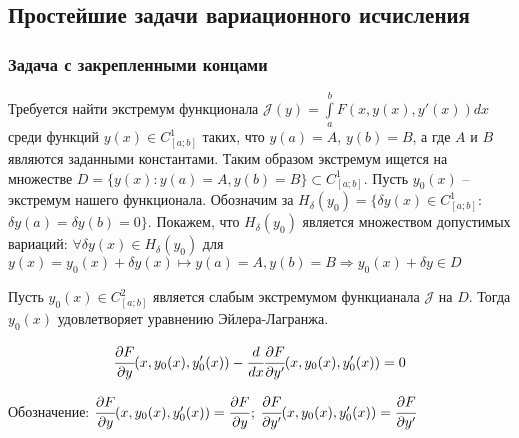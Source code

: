     \subsection{Простейшие задачи вариационного исчисления}
    \subsubsection{Задача с закрепленными концами}

    Требуется найти экстремум функционала $\mathcal{J} (y) = \int \limits^b_a F(x, y(x), y'(x)) dx$ среди функций $y(x) \in C^1_{[a;b]}$ таких, что $y(a) = A$, $y(b) = B$, а где $A$ и $B$ являются заданными константами.
    Таким образом экстремум ищется на множестве $D = \{y(x): y(a) = A, y(b) = B \} \subset C^1_{[a;b]}$. Пусть $y_0(x)$ -- экстремум нашего функционала. 
    Обозначим за $H_{\delta}(y_0) = \{ \delta y(x) \in C^1_{[a;b]}$: $\delta y(a) = \delta y(b) = 0 \}$.
    Покажем, что $H_{\delta}(y_0)$ является множеством допустимых вариаций: $\forall \delta y(x) \in H_{\delta}(y_0)$ для $y(x) = y_0(x) + \delta y(x) \mapsto y(a) = A, y(b) = B \Rightarrow y_0(x) + \delta y \in D$
    
    \begin{theorem}
        Пусть $y_0(x) \in C^2_{[a;b]}$ является слабым экстремумом функцианала $\mathcal{J}$ на $D$. Тогда $y_0(x)$ удовлетворяет уравнению Эйлера-Лагранжа.
        
        \begin{equation} \label{issue15:IF}
            \cfrac{\partial F}{\partial y}(x, y_0(x), y'_0(x)) - \cfrac{d}{dx} \cfrac{\partial F}{\partial y'} (x, y_0(x), y'_0(x)) = 0
        \end{equation}

        Обозначение: $\cfrac{\partial F}{\partial y}(x, y_0(x), y'_0(x)) = \cfrac{\partial F}{\partial y}$; $\cfrac{\partial F}{\partial y'} (x, y_0(x), y'_0(x)) = \cfrac{\partial F}{\partial y'}$

    \end{theorem}


